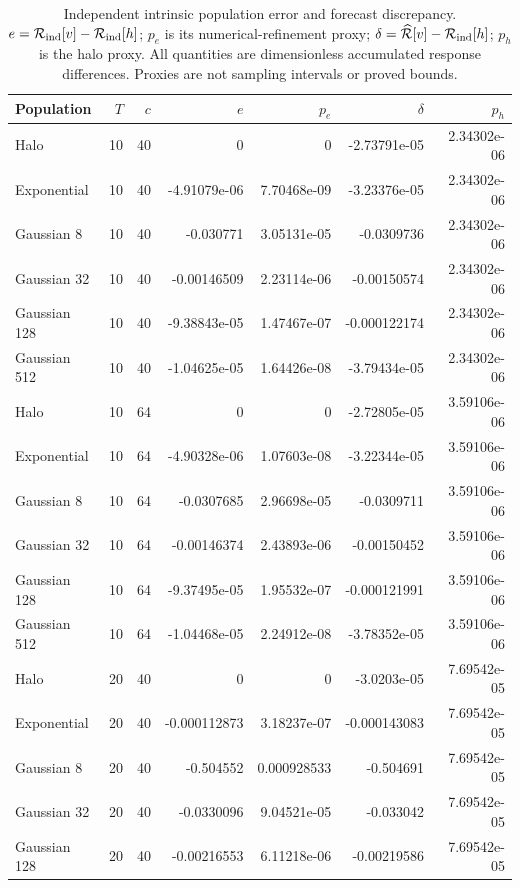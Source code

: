 \documentclass[fleqn,usenatbib]{mnras}
\begin{document}
\begin{table}
\centering
\caption{Independent intrinsic population error and forecast discrepancy. $e=\mathcal R_{\rm ind}[v]-\mathcal R_{\rm ind}[h]$; $p_e$ is its numerical-refinement proxy; $\delta=\widehat{\mathcal R}[v]-\mathcal R_{\rm ind}[h]$; $p_h$ is the halo proxy. All quantities are dimensionless accumulated response differences. Proxies are not sampling intervals or proved bounds.}\label{tab-errors}
\small
\setlength{\tabcolsep}{4pt}
\begin{tabular}{lrrrrrr}
\toprule
Population & $T$ & $c$ & $e$ & $p_e$ & $\delta$ & $p_h$ \\
\midrule
Halo & 10 & 40 & 0 & 0 & -2.73791e-05 & 2.34302e-06 \\
Exponential & 10 & 40 & -4.91079e-06 & 7.70468e-09 & -3.23376e-05 & 2.34302e-06 \\
Gaussian 8 & 10 & 40 & -0.030771 & 3.05131e-05 & -0.0309736 & 2.34302e-06 \\
Gaussian 32 & 10 & 40 & -0.00146509 & 2.23114e-06 & -0.00150574 & 2.34302e-06 \\
Gaussian 128 & 10 & 40 & -9.38843e-05 & 1.47467e-07 & -0.000122174 & 2.34302e-06 \\
Gaussian 512 & 10 & 40 & -1.04625e-05 & 1.64426e-08 & -3.79434e-05 & 2.34302e-06 \\
Halo & 10 & 64 & 0 & 0 & -2.72805e-05 & 3.59106e-06 \\
Exponential & 10 & 64 & -4.90328e-06 & 1.07603e-08 & -3.22344e-05 & 3.59106e-06 \\
Gaussian 8 & 10 & 64 & -0.0307685 & 2.96698e-05 & -0.0309711 & 3.59106e-06 \\
Gaussian 32 & 10 & 64 & -0.00146374 & 2.43893e-06 & -0.00150452 & 3.59106e-06 \\
Gaussian 128 & 10 & 64 & -9.37495e-05 & 1.95532e-07 & -0.000121991 & 3.59106e-06 \\
Gaussian 512 & 10 & 64 & -1.04468e-05 & 2.24912e-08 & -3.78352e-05 & 3.59106e-06 \\
Halo & 20 & 40 & 0 & 0 & -3.0203e-05 & 7.69542e-05 \\
Exponential & 20 & 40 & -0.000112873 & 3.18237e-07 & -0.000143083 & 7.69542e-05 \\
Gaussian 8 & 20 & 40 & -0.504552 & 0.000928533 & -0.504691 & 7.69542e-05 \\
Gaussian 32 & 20 & 40 & -0.0330096 & 9.04521e-05 & -0.033042 & 7.69542e-05 \\
Gaussian 128 & 20 & 40 & -0.00216553 & 6.11218e-06 & -0.00219586 & 7.69542e-05 \\

\end{tabular}
\end{table}
\end{document}
